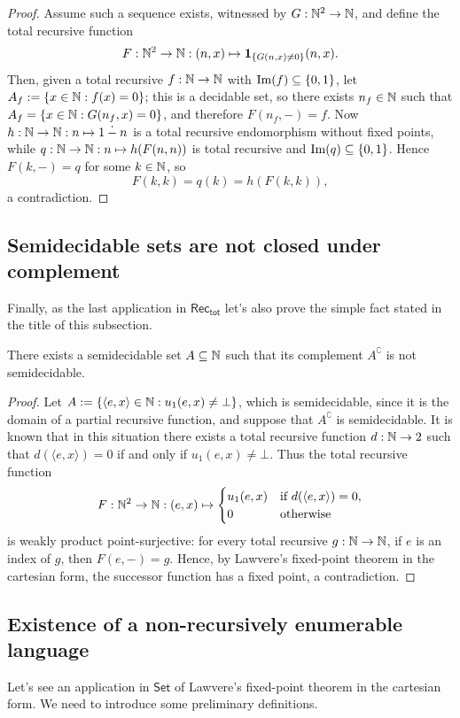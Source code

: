 \begin{proof}
    Assume such a sequence exists, witnessed by $G:\mathbb{N}^2\to\mathbb{N}$, and define the total recursive function
    \[ F : \mathbb{N}^2 \to \mathbb{N} : (n,x) \mapsto \mathbf 1_{\{G(n,x)\ne 0\}}(n,x). \]
    Then, given a total recursive $f : \mathbb{N} \to \mathbb{N}$ with $\operatorname{Im}(f)\subseteq\{0,1\}$, let $A_f := \{x \in \mathbb{N} : f(x) = 0\}$; this is a decidable set, so there exists $n_f \in \mathbb{N}$ such that $A_f = \{x \in \mathbb{N} : G(n_f,x) = 0\}$, and therefore $F(n_f,-)=f$.
    Now $h:\mathbb{N}\to\mathbb{N}:n\mapsto1\mathbin{\dot{-}}n$ is a total recursive endomorphism without fixed points, while $q:\mathbb{N}\to\mathbb{N}:n\mapsto h(F(n,n))$ is total recursive and $\operatorname{Im}(q)\subseteq\{0,1\}$. Hence $F(k,-)=q$ for some $k\in\mathbb{N}$, so
    \[ F(k,k)=q(k)=h(F(k,k)), \]
    a contradiction.
\end{proof}

\subsection*{Semidecidable sets are not closed under complement}
Finally, as the last application in $\mathsf{Rec_{tot}}$ let's also prove the simple fact stated in the title of this subsection.

\begin{proposition}
    There exists a semidecidable set $A \subseteq \mathbb{N}$ such that its complement $A^{\complement}$ is not semidecidable.
\end{proposition}

\begin{proof}
    Let $A:=\{\langle e,x\rangle\in\mathbb{N}:u_1(e,x)\ne\bot\}$, which is semidecidable, since it is the domain of a partial recursive function, and suppose that $A^{\complement}$ is semidecidable.
    It is known that in this situation there exists a total recursive function $d:\mathbb{N}\to 2$ such that $d(\langle e,x\rangle)=0$ if and only if $u_1(e,x)\ne\bot$. Thus the total recursive function
    \[ F:\mathbb{N}^2\to\mathbb{N}:(e,x)\mapsto\begin{cases}u_1(e,x)&\text{if $d(\langle e,x\rangle)=0$},\\0&\text{otherwise}
    \end{cases} \]
    is weakly product point-surjective: for every total recursive $g:\mathbb{N}\to\mathbb{N}$, if $e$ is an index of $g$, then $F(e,-)=g$. Hence, by Lawvere's fixed-point theorem in the cartesian form, the successor function has a fixed point, a contradiction.
\end{proof}

\subsection*{Existence of a non-recursively enumerable language}
Let's see an application in $\mathsf{Set}$ of Lawvere's fixed-point theorem in the cartesian form. We need to introduce some preliminary definitions.

